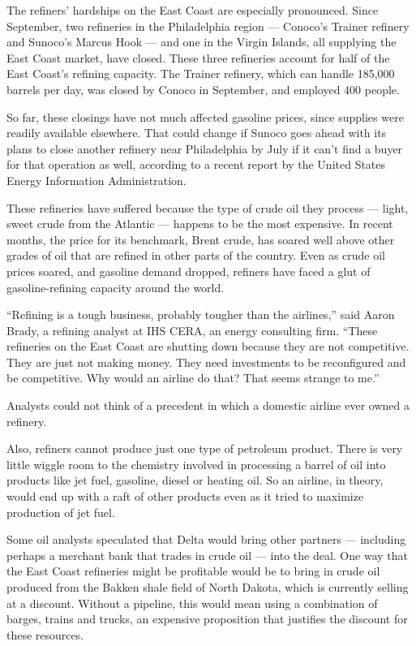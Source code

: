 The refiners' hardships on the East Coast are especially pronounced.
Since September, two refineries in the Philadelphia region --- Conoco's
Trainer refinery and Sunoco's Marcus Hook --- and one in the Virgin
Islands, all supplying the East Coast market, have closed. These three
refineries account for half of the East Coast's refining capacity. The
Trainer refinery, which can handle 185,000 barrels per day, was closed
by Conoco in September, and employed 400 people.

So far, these closings have not much affected gasoline prices, since
supplies were readily available elsewhere. That could change if Sunoco
goes ahead with its plans to close another refinery near Philadelphia by
July if it can't find a buyer for that operation as well, according to a
recent report by the United States Energy Information Administration.

These refineries have suffered because the type of crude oil they
process --- light, sweet crude from the Atlantic --- happens to be the
most expensive. In recent months, the price for its benchmark, Brent
crude, has soared well above other grades of oil that are refined in
other parts of the country. Even as crude oil prices soared, and
gasoline demand dropped, refiners have faced a glut of gasoline-refining
capacity around the world.

``Refining is a tough business, probably tougher than the airlines,''
said Aaron Brady, a refining analyst at IHS CERA, an energy consulting
firm. ``These refineries on the East Coast are shutting down because
they are not competitive. They are just not making money. They need
investments to be reconfigured and be competitive. Why would an airline
do that? That seems strange to me.''

Analysts could not think of a precedent in which a domestic airline ever
owned a refinery.

Also, refiners cannot produce just one type of petroleum product. There
is very little wiggle room to the chemistry involved in processing a
barrel of oil into products like jet fuel, gasoline, diesel or heating
oil. So an airline, in theory, would end up with a raft of other
products even as it tried to maximize production of jet fuel.

Some oil analysts speculated that Delta would bring other partners ---
including perhaps a merchant bank that trades in crude oil --- into the
deal. One way that the East Coast refineries might be profitable would
be to bring in crude oil produced from the Bakken shale field of North
Dakota, which is currently selling at a discount. Without a pipeline,
this would mean using a combination of barges, trains and trucks, an
expensive proposition that justifies the discount for these resources.

